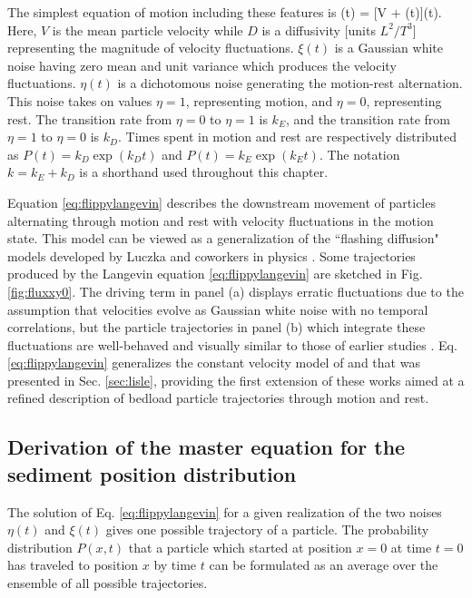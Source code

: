 The simplest equation of motion including these features is
\be {}(t) = [V + \xi(t)]\eta(t).  \label{eq:flippylangevin} \ee
Here, $V$ is the mean particle velocity while $D$ is a diffusivity [units $L^2/T^3$] representing the magnitude of velocity fluctuations.
$\xi(t)$ is a Gaussian white noise having zero mean and unit variance which produces the velocity fluctuations. $\eta(t)$ is a dichotomous noise generating the motion-rest alternation. This noise takes on values $\eta = 1$, representing motion, and $\eta=0$, representing rest.
The transition rate from $\eta=0$ to $\eta = 1$ is $k_E$, and the transition rate from $\eta=1$ to $\eta= 0$ is $k_D$. Times spent in motion and rest are respectively distributed as $P(t) = k_D \exp(k_D t)$ and $P(t) = k_E \exp(k_E t)$. The notation $k=k_E+k_D$ is a shorthand used throughout this chapter.

Equation \ref{eq:flippylangevin} describes the downstream movement of particles alternating through motion and rest with velocity fluctuations in the motion state.
This model can be viewed as a generalization of the ``flashing diffusion" models developed by Luczka and coworkers in physics \citep{Luczka1992,Luczka1993,Luczka1995}.
Some trajectories produced by the Langevin equation \ref{eq:flippylangevin} are sketched in Fig. \ref{fig:fluxxy0}.
The driving term in panel (a) displays erratic fluctuations due to the assumption that velocities evolve as Gaussian white noise with no temporal correlations, but the particle trajectories in panel (b) which integrate these fluctuations are well-behaved and visually similar to those of earlier studies \citep[cf.][]{Fan2016,Bialik2015}.
Eq. \ref{eq:flippylangevin} generalizes the constant velocity model of \citet{Lisle1998} and \citet{Lajeunesse2017} that was presented in Sec. \ref{sec:lisle}, providing the first extension of these works aimed at a refined description of bedload particle trajectories through motion and rest.


\subsection{Derivation of the master equation for the sediment position distribution}
\label{sec:floppymastereq}
The solution of Eq. \ref{eq:flippylangevin} for a given realization of the two noises $\eta(t)$ and $\xi(t)$ gives one possible trajectory of a particle. The probability distribution $P(x,t)$ that a particle which started at position $x=0$ at time $t=0$ has traveled to position $x$ by time $t$ can be formulated as an average over the ensemble of all possible trajectories.

